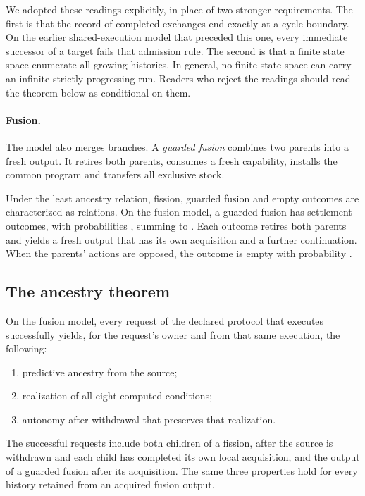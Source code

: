 We adopted these readings explicitly, in place of two stronger requirements.
The first is that the record of completed exchanges end exactly at a cycle
boundary. On the earlier shared-execution model that preceded this one, every
immediate successor of a target fails that admission rule. The second is that
a finite state space enumerate all growing histories. In general, no finite
state space can carry an infinite strictly progressing run. Readers who reject
the readings should read the theorem below as conditional on them.

\paragraph{Fusion.}
The model also merges branches. A \emph{guarded fusion} combines two parents
into a fresh output. It retires both parents, consumes a fresh capability,
installs the common program and transfers all exclusive stock.

\begin{proposition}
\label{prop:fusion}
Under the least ancestry relation, fission, guarded fusion and empty outcomes
are characterized as relations. On the fusion model, a guarded fusion has
\snapFullNativeZeroTwoFusionOutcomeCount{} settlement outcomes, with
probabilities \snapFullNativeZeroTwoFusionSettlementProbabilities{}, summing
to \snapFullNativeZeroTwoFusionProbabilitySum{}. Each outcome retires both
parents and yields a fresh output that has its own acquisition and a further
continuation. When the parents' actions are opposed, the outcome is empty with
probability \snapFullNativeZeroTwoEmptyProbability{}.
\end{proposition}

\subsection{The ancestry theorem}

\begin{theorem}
\label{thm:ancestry}
On the fusion model, every request of the declared protocol that executes
successfully yields, for the request's owner and from that same execution, the
following:
\begin{enumerate}
\item predictive ancestry from the source;
\item realization of all eight computed conditions;
\item autonomy after withdrawal that preserves that realization.
\end{enumerate}
The successful requests include both children of a fission, after the source
is withdrawn and each child has completed its own local acquisition, and the
output of a guarded fusion after its acquisition. The same three properties
hold for every history retained from an acquired fusion output.
\end{theorem}

